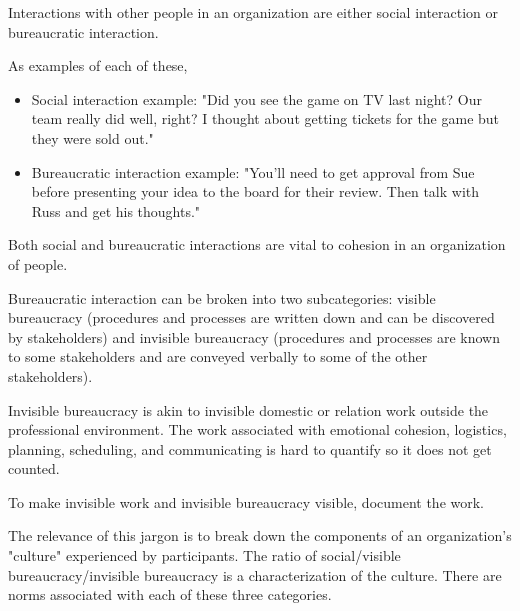 
Interactions with other people in an organization are either social interaction or bureaucratic interaction. 

As examples of each of these,
\begin{itemize}
\item Social interaction example: "Did you see the game on TV last night? Our team really did well, right? I thought about getting tickets for the game but they were sold out."
\item Bureaucratic interaction example: "You'll need to get approval from Sue before presenting your idea to the board for their review. Then talk with Russ and get his thoughts."
\end{itemize}
Both social and bureaucratic interactions are vital to cohesion in an organization of people. 


Bureaucratic interaction can be broken into two subcategories: \gls{visible bureaucracy} (procedures and processes are written down and can be discovered by stakeholders)  and \gls{invisible bureaucracy} (procedures and processes are known to some stakeholders and are conveyed verbally to some of the other stakeholders).

Invisible bureaucracy is akin to invisible domestic or relation work outside the professional environment. The work associated with emotional cohesion, logistics, planning, scheduling, and communicating is hard to quantify so it does not get counted.

To make invisible work and invisible bureaucracy visible, document the work.


The relevance of this jargon is to break down the components of an organization's "culture" experienced by participants. The ratio of social/visible bureaucracy/invisible bureaucracy is a characterization of the culture. There are norms associated with each of these three categories.